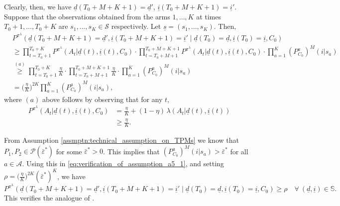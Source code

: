 Clearly, then, we have $\underline{d}(T_0+M+K+1)=\underline{d}'$, $\underline{i}(T_0+M+K+1)=\underline{i}'$. Suppose that the observations obtained from the arms $1, \ldots, K$ at times $T_0+1, \ldots, T_0+K$ are $s_1, \ldots, s_K \in \mathcal{S}$ respectively. Let $\underline{s}=(s_1, \ldots, s_K)$. Then,
\begin{align}
	& P^{\pi^\lambda}(\underline{d}(T_0+M+K+1)=\underline{d}', \underline{i}(T_0+M+K+1)=\underline{i}'\mid \underline{d}(T_0)=\underline{d}, \underline{i}(T_0)=\underline{i}, C_0) \nonumber\\
	& \geq \prod\limits_{t=T_0+1}^{T_0+K} P^{\pi^\lambda}(A_t|\underline{d}(t), \underline{i}(t), C_0)\cdot  \prod\limits_{t=T_0+M+1}^{T_0+M+K+1} P^{\pi^\lambda}(A_t|\underline{d}(t), \underline{i}(t), C_0) \cdot \prod\limits_{a=1}^{K} (P_{C_0}^a)^M(i|s_a)\nonumber\\
	& \stackrel{(a)}{\geq}  \prod\limits_{t=T_0+1}^{T_0+K} \frac{\eta}{K} \cdot  \prod\limits_{t=T_0+M+1}^{T_0+M+K+1} \frac{\eta}{K} \cdot \prod\limits_{a=1}^{K} (P_{C_0}^a)^M(i|s_a)\nonumber\\
	& = \bigg(\frac{\eta}{K}\bigg)^{2K} \prod\limits_{a=1}^{K} (P_{C_0}^a)^M(i|s_a),
	\label{eq:verification_of_assumption_a5_1}
\end{align}
where $(a)$ above follows by observing that for any $t$,
\begin{align*}
	P^{\pi^\lambda}(A_t|\underline{d}(t), \underline{i}(t), C_0) &= \frac{\eta}{K} + (1-\eta)\,\lambda(A_t|\underline{d}(t), \underline{i}(t)) \\
	& \geq \frac{\eta}{K}.
\end{align*}

From Assumption \ref{assmptn:technical_assumption_on_TPMs} we know that $P_1, P_2\in \mathscr{P}(\bar{\varepsilon}^*)$ for some $\bar{\varepsilon}^*>0$. This implies that $(P_{C_0}^a)^M(i|s_a)>\bar{\varepsilon}^*$ for all $a\in \mathcal{A}$. Using this in \eqref{eq:verification_of_assumption_a5_1}, and setting $\rho = \bigg(\frac{\eta}{K}\bigg)^{2K} (\bar{\varepsilon}^*)^K$, we have
\begin{equation}
	P^{\pi^\lambda}(\underline{d}(T_0+M+K+1)=\underline{d}', \underline{i}(T_0+M+K+1)=\underline{i}'\mid \underline{d}(T_0)=\underline{d}, \underline{i}(T_0)=\underline{i}, C_0) \geq \rho\quad \forall~(\underline{d}, \underline{i})\in \mathbb{S}.
	\label{eq:verification_of_assumption_a5_2}
\end{equation}
This verifies the analogue of \cite[Condition C2]{federgruen1978note}.

